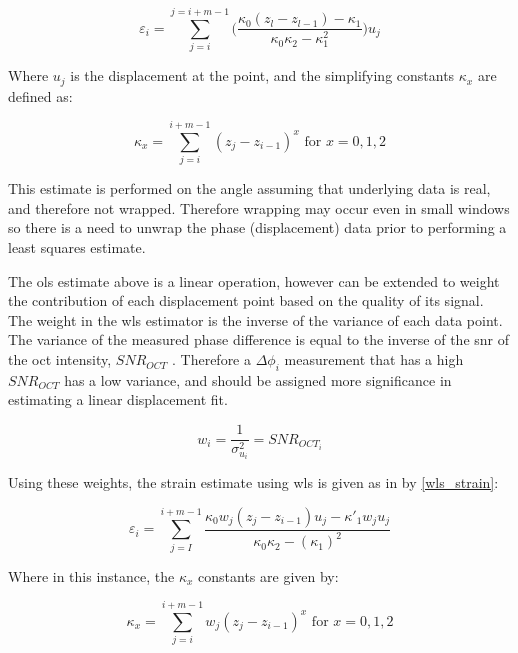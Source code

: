 \begin{equation}
	\label{ols_strain}
	\varepsilon_i = \sum\limits_{j=i}^{j=i+m-1} \bigg(\frac{\kappa_0 (z_l-z_{l-1})-\kappa_1}{\kappa_0 \kappa_2 - \kappa_1^2} \bigg) u_j
\end{equation}

Where $u_j$ is the displacement at the point, and the simplifying constants $\kappa_x$ are defined as:

\begin{equation}
	\label{ols_k}
	\kappa_x = \sum \limits_{j=i}^{i+m-1} (z_j - z_{i-1})^x \text{   for   } x = 0,1,2
\end{equation}

This estimate is performed on the angle assuming that underlying data is real, and therefore not wrapped. Therefore wrapping may occur even in small windows so there is a need to unwrap the phase (displacement) data prior to performing a least squares estimate. 

The \ac{ols} estimate above is a linear operation, however can be extended to weight the contribution of each displacement point based on the quality of its signal. 
The weight in the \ac{wls} estimator is the inverse of the variance of each data point.
The variance of the measured phase difference is equal to the inverse of the \ac{snr} of the \ac{oct} intensity, $SNR_{OCT}$ \cite{goodman_statistical_2015}. Therefore a $\Delta \phi_i$ measurement that has a high $SNR_{OCT}$ has a low variance, and should be assigned more significance in estimating a linear displacement fit. 

\begin{equation}
	\label{wls_w}
	w_i = \frac{1}{\sigma_{u_i}^2} = SNR_{OCT_i}
\end{equation}

Using these weights, the strain estimate using \ac{wls} is given as in \cite{kennedy_strain_2012} by \autoref{wls_strain}:

\begin{equation}
	\label{wls_strain}
	\varepsilon_i = \sum \limits_{j=I}^{i+m-1} \frac{\kappa_0 w_j (z_j - z_{i-1}) u_j - \kappa'_1 w_	j u_j}{\kappa_0 \kappa_2 - (\kappa_1)^2}
\end{equation}

Where in this instance, the $\kappa_x$ constants are given by:

\begin{equation}
	\label{wls_k}
	\kappa_x = \sum \limits_{j=i}^{i+m-1} w_j (z_j - z_{i-1})^x \text{   for   } x=0,1,2
\end{equation}

